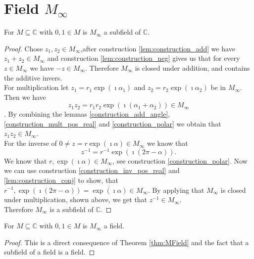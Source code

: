 \section[Filed of Constructable Numbers]{Field $M_{\infty}$}
\begin{theorem}
    For $M\subseteq \mathbb{C}$ with $0,1 \in M$ is $M_{\infty}$ a subfield of $\mathbb{C}$.
\end{theorem}
\begin{proof}
    Chose $z_1, z_2 \in M_{\infty}$,after construction \ref{lem:construction_add}
    we have $z_1 + z_2 \in M_{\infty}$ and construction \ref{lem:construction_neg}
    gives us that for every $z \in M_{\infty}$ we have $-z \in M_{\infty}$. Therefore $M_{\infty}$ is closed under addition, and contains the additive invers.\\
    For multiplication let $z_1 = r_1 \exp(\imath \alpha_1)$ and $z_2 = r_2 \exp(\imath \alpha_2)$ be in $M_{\infty}$. Then we have 
    $$z_1 z_2 = r_1 r_2 \exp(\imath (\alpha_1 + \alpha_2)) \in M_{\infty}$$. By combining the lemmas \ref{construction_add_angle}, \ref{construction_mult_pos_real} and \ref{construction_polar}
    we obtain that $z_1 z_2 \in M_{\infty}$.\\
    For the inverse of $0 \ne z = r \exp(\imath \alpha) \in M_{\infty}$ we know that $$z^{-1} = r^{-1} \exp(\imath(2\pi - \alpha)).$$ We know that $r, \exp(\imath \alpha) \in M_{\infty}$, see construction \ref{construction_polar}.
    Now we can use construction \ref{construction_inv_pos_real} and \ref{lem:construction_conj} to show,
    that $r^{-1}, \exp(\imath(2\pi - \alpha)) = \overline{\exp(\imath\alpha)} \in M_{\infty}$. By applying that $M_{\infty}$ is closed under multiplication, shown above, we get that $z^{-1} \in M_{\infty}$.\\
    Therefore $M_{\infty}$ is a subfield of $\mathbb{C}$.
\end{proof}

\begin{corollary} 
    For $M\subseteq \mathbb{C}$ with $0,1 \in M$ is $M_{\infty}$ a field.
\end{corollary}
\begin{proof}
    This is a direct consequence of Theorem \ref{thm:MField} and the fact that a subfield of a field is a field.
\end{proof}


